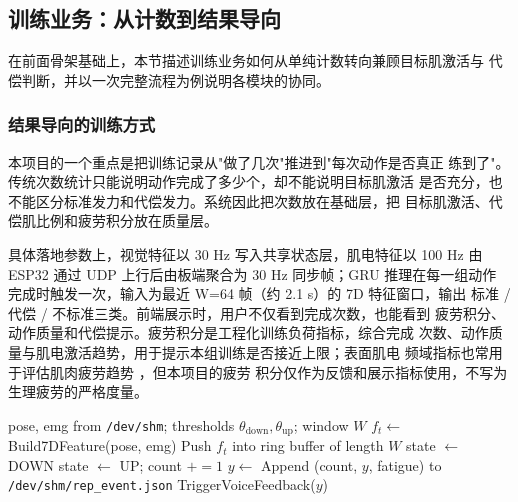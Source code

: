 \subsection{训练业务：从计数到结果导向}

在前面骨架基础上，本节描述训练业务如何从单纯计数转向兼顾目标肌激活与
代偿判断，并以一次完整流程为例说明各模块的协同。

\subsubsection{结果导向的训练方式}

本项目的一个重点是把训练记录从"做了几次"推进到"每次动作是否真正
练到了"。传统次数统计只能说明动作完成了多少个，却不能说明目标肌激活
是否充分，也不能区分标准发力和代偿发力。系统因此把次数放在基础层，把
目标肌激活、代偿肌比例和疲劳积分放在质量层。

具体落地参数上，视觉特征以 30 Hz 写入共享状态层，肌电特征以 100 Hz 由
ESP32 通过 UDP 上行后由板端聚合为 30 Hz 同步帧；GRU 推理在每一组动作
完成时触发一次，输入为最近 W=64 帧（约 2.1 s）的 7D 特征窗口，输出
标准 / 代偿 / 不标准三类。前端展示时，用户不仅看到完成次数，也能看到
疲劳积分、动作质量和代偿提示。疲劳积分是工程化训练负荷指标，综合完成
次数、动作质量与肌电激活趋势，用于提示本组训练是否接近上限；表面肌电
频域指标也常用于评估肌肉疲劳趋势 \cite{cifrek2009}，但本项目的疲劳
积分仅作为反馈和展示指标使用，不写为生理疲劳的严格度量。

\begin{algorithm}[htbp]
\caption{每帧 FSM 计数与 GRU 质量判断（以深蹲为例）}
\label{alg:fsm-gru}
\begin{algorithmic}[1]
\Require pose, emg from \texttt{/dev/shm}; thresholds $\theta_{\text{down}}, \theta_{\text{up}}$; window $W$
\State $f_t \gets$ Build7DFeature(pose, emg)
\Statex \quad {}
\State Push $f_t$ into ring buffer of length $W$
    \State state $\gets$ DOWN
    \State state $\gets$ UP; \quad count $\mathrel{+}{=} 1$
    \State $y \gets$ 
    \Statex \quad {}
    \State Append (count, $y$, fatigue) to \texttt{/dev/shm/rep\_event.json}
     \State TriggerVoiceFeedback($y$) \EndIf
\EndIf
\end{algorithmic}
\end{algorithm}

